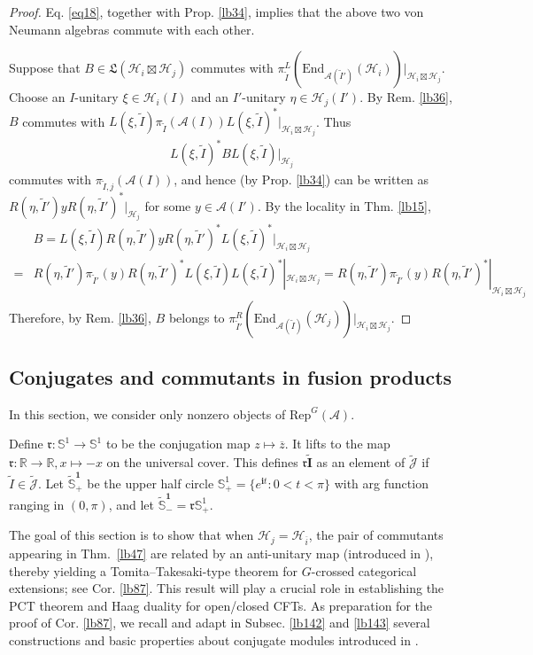 \documentclass[11pt,b5paper,notitlepage]{article}
\theoremstyle{definition}
\theoremstyle{plain}
\newcommand{\fk}{\mathfrak}
\newcommand{\wtd}{\widetilde}
\newcommand{\ovl}{\overline}
\newcommand{\End}{\mathrm{End}} %
\newcommand{\RepGA}{\mathrm{Rep}^G(\mathcal A)}
\newcommand{\Jtd}{\widetilde{\mathcal J}}
\newcommand{\im}{\mathbf{i}}
\newcommand{\Rbb}{\mathbb R}
\newcommand{\Sbb}{{\mathbb S}}
\newcommand{\rk}{\mathfrak r}
\newcommand{\MA}{\mathcal A}
\newcommand{\MH}{\mathcal H}
\numberwithin{equation}{section}
\begin{document}
\begin{proof}
Eq. \eqref{eq18}, together with Prop. \ref{lb34}, implies that the above two von Neumann algebras commute with each other. 

Suppose that $B\in\fk L(\MH_i\boxtimes\MH_j)$ commutes with $\pi^L_{\wtd I}(\End_{\MA(\wtd I')}(\MH_i))\big|_{\MH_i\boxtimes\MH_j}$. Choose an $I$-unitary $\xi\in\MH_i(I)$ and an $I'$-unitary $\eta\in\MH_j(I')$. By Rem. \ref{lb36}, $B$ commutes with $L(\xi,\wtd I)\pi_{\wtd I}(\MA(I))L(\xi,\wtd I)^*|_{\MH_i\boxtimes\MH_j}$. Thus
\begin{align*}
L(\xi,\wtd I)^*BL(\xi,\wtd I)|_{\MH_j}
\end{align*}
commutes with $\pi_{\wtd I,j}(\MA(I))$, and hence (by Prop. \ref{lb34}) can be written as $R(\eta,\wtd I')yR(\eta,\wtd I')^*|_{\MH_j}$ for some $y\in\MA(I')$. By the locality in Thm. \ref{lb15}, 
\begin{align*}
&B=L(\xi,\wtd I)R(\eta,\wtd I')yR(\eta,\wtd I')^*L(\xi,\wtd I)^*|_{\MH_i\boxtimes\MH_j}\\
=&R(\eta,\wtd I')\pi_{\wtd I'}(y)R(\eta,\wtd I')^*L(\xi,\wtd I)L(\xi,\wtd I)^*|_{\MH_i\boxtimes\MH_j}=R(\eta,\wtd I')\pi_{\wtd I'}(y)R(\eta,\wtd I')^*|_{\MH_i\boxtimes\MH_j}
\end{align*}
Therefore, by Rem. \ref{lb36}, $B$ belongs to $\pi^R_{\wtd I'}(\End_{\MA(\wtd I)}(\MH_j))\big|_{\MH_i\boxtimes\MH_j}$.
\end{proof}






\subsection{Conjugates and commutants in fusion products}

In this section, we consider only nonzero objects of $\RepGA$.

Define $\pmb{\rk}:\Sbb^1\rightarrow\Sbb^1$ to be the conjugation map $z\mapsto \ovl z$. It lifts to the map  $\rk:\Rbb\rightarrow\Rbb,x\mapsto -x$ on the universal cover. This defines $\pmb{\rk\wtd I}$ as an element of $\Jtd$ if $\wtd I\in\Jtd$. Let $\pmb{\wtd\Sbb^1_+}$ be the upper half circle $\Sbb^1_+=\{e^{\im t}:0<t<\pi\}$ with arg function ranging in $(0,\pi)$, and let $\pmb{\wtd\Sbb^1_-}=\rk\Sbb^1_+$.


The goal of this section is to show that when $\MH_j=\MH_{\ovl i}$, the pair of commutants appearing in Thm.~\ref{lb47} are related by an anti-unitary map (introduced in \cite[Sec. A]{MS26a}), thereby yielding a Tomita--Takesaki-type theorem for $G$-crossed categorical extensions; see Cor. \ref{lb87}. This result will play a crucial role in establishing the PCT theorem and Haag duality for open/closed CFTs. As preparation for the proof of Cor. \ref{lb87}, we recall and adapt in Subsec. \ref{lb142} and \ref{lb143} several constructions and basic properties about conjugate modules introduced in \cite[Sec. A]{MS26a}.
\end{document}
